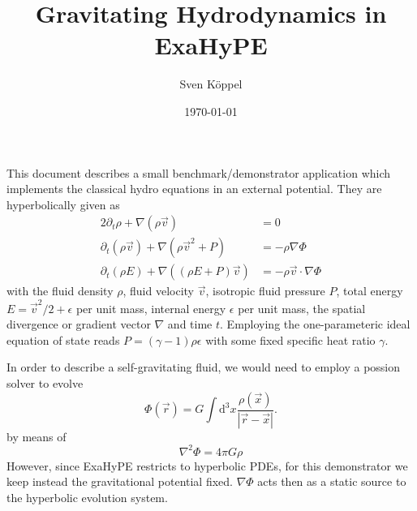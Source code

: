\documentclass[a4paper]{article}
\title{Gravitating Hydrodynamics in ExaHyPE}
\author{Sven Köppel}
\date{\today}
\begin{document}
\maketitle

This document describes a small benchmark/demonstrator
application which implements the classical hydro equations
in an external potential. They are hyperbolically given
as
%
\begin{alignat}{2}
\partial_t \rho + \nabla ( \rho \vec v ) &= 0
\\
\partial_t (\rho \vec v) + \nabla ( \rho \vec v^2 + P)
&= - \rho \nabla \Phi
\\
\partial_t (\rho E) + \nabla ((\rho E + P)\vec v)
&= - \rho \vec v \cdot \nabla \Phi
\end{alignat}
%
with the fluid density $\rho$, fluid velocity $\vec v$,
isotropic fluid pressure $P$,
total energy $E=\vec v^2 / 2 + \epsilon$ per unit mass,
internal energy $\epsilon$ per unit mass, the spatial divergence or gradient vector $\nabla$ and time $t$. Employing
the one-parameteric ideal equation of state reads
$P=(\gamma-1)\rho \epsilon$ with some fixed
specific heat ratio $\gamma$.

In order to describe a self-gravitating fluid, we would need
to employ a possion solver to evolve
\begin{equation}
\Phi(\vec r) = G \int \mathrm{d}^3 x
\frac{\rho(\vec x)}{\left| \vec r - \vec x \right|}.
\end{equation}
by means of
\begin{equation}
\nabla^2 \Phi = 4\pi G \rho
\end{equation}
However, since ExaHyPE restricts to hyperbolic PDEs, for this
demonstrator we keep instead the gravitational potential fixed.
$\nabla \Phi$ acts then as a static source to the hyperbolic
evolution system.
\end{document}
